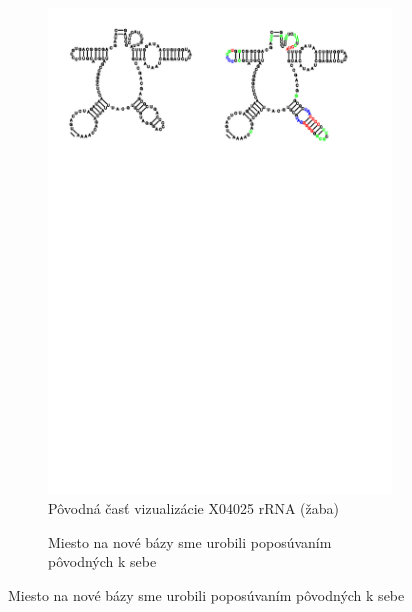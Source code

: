 \begin{figure}[t!]
  \centering
  \begin{subfigure}[t]{\wi}
    \caption{Pôvodná časť vizualizácie X04025 rRNA (žaba)}
    \includegraphics[clip, trim=1cm 21cm 12cm 1cm, width=1\textwidth]{../img/alg/insert/multibranch}
  \end{subfigure}
  \begin{subfigure}[t]{\wi}
    \caption{Miesto na nové bázy sme urobili poposúvaním pôvodných k sebe}

\end{subfigure}
\end{figure}
